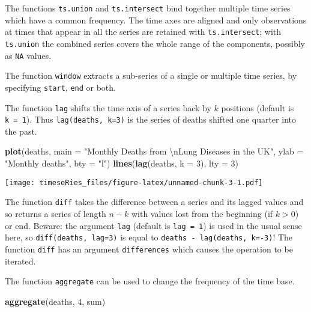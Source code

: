 \documentclass[]{book}
\newenvironment{Shaded}{\begin{snugshade}}{\end{snugshade}}
\newcommand{\KeywordTok}[1]{\textcolor[rgb]{0.13,0.29,0.53}{\textbf{#1}}}
\newcommand{\DataTypeTok}[1]{\textcolor[rgb]{0.13,0.29,0.53}{#1}}
\newcommand{\DecValTok}[1]{\textcolor[rgb]{0.00,0.00,0.81}{#1}}
\newcommand{\CharTok}[1]{\textcolor[rgb]{0.31,0.60,0.02}{#1}}
\newcommand{\StringTok}[1]{\textcolor[rgb]{0.31,0.60,0.02}{#1}}
\newcommand{\NormalTok}[1]{#1}
\begin{document}
The functions \texttt{ts.union} and \texttt{ts.intersect} bind together
multiple time series which have a common frequency. The time axes are
aligned and only observations at times that appear in all the series are
retained with \texttt{ts.intersect}; with \texttt{ts.union} the combined
series covers the whole range of the components, possibly as \texttt{NA}
values.

The function \texttt{window} extracts a sub-series of a single or
multiple time series, by specifying \texttt{start}, \texttt{end} or
both.

The function \texttt{lag} shifts the time axis of a series back by \(k\)
positions (default is \texttt{k\ =\ 1}). Thus \texttt{lag(deaths,\ k=3)}
is the series of deaths shifted one quarter into the past.

\begin{Shaded}
\begin{Highlighting}[]
\KeywordTok{plot}\NormalTok{(deaths, }\DataTypeTok{main =} \StringTok{"Monthly Deaths from }\CharTok{\textbackslash{}n}\StringTok{Lung Diseases in the UK"}\NormalTok{, }\DataTypeTok{ylab =} \StringTok{"Monthly deaths"}\NormalTok{, }
    \DataTypeTok{bty =} \StringTok{"l"}\NormalTok{)}
\KeywordTok{lines}\NormalTok{(}\KeywordTok{lag}\NormalTok{(deaths, }\DataTypeTok{k =} \DecValTok{3}\NormalTok{), }\DataTypeTok{lty =} \DecValTok{3}\NormalTok{)}
\end{Highlighting}
\end{Shaded}

\texttt{[image: timeseRies\_files/figure-latex/unnamed-chunk-3-1.pdf]}

The function \texttt{diff} takes the difference between a series and its
lagged values and so returns a series of length \(n-k\) with values lost
from the beginning (if \(k>0\)) or end. Beware: the argument
\texttt{lag} (default is \texttt{lag\ =\ 1}) is used in the usual sense
here, so \texttt{diff(deaths,\ lag=3)} is equal to
\texttt{deaths\ -\ lag(deaths,\ k=-3)}! The function \texttt{diff} has
an argument \texttt{differences} which causes the operation to be
iterated.

The function \texttt{aggregate} can be used to change the frequency of
the time base.

\begin{Shaded}
\begin{Highlighting}[]
\KeywordTok{aggregate}\NormalTok{(deaths, }\DecValTok{4}\NormalTok{, sum)}
\end{Highlighting}
\end{Shaded}
\end{document}
